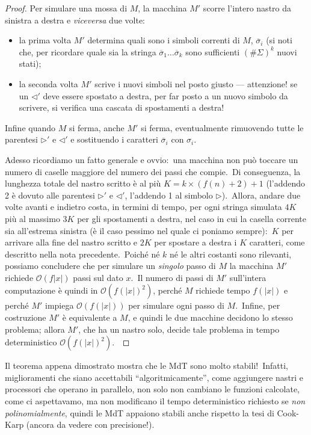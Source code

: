 \begin{proof}
    Per simulare una mossa di $M$, la macchina $M'$ scorre l'intero nastro da sinistra a destra e \textit{viceversa} due volte:
    \begin{itemize}
        \item la prima volta $M'$ determina quali sono i simboli correnti di $M$, $\overline{\sigma}_i$ (si noti che, per ricordare quale sia la stringa $\overline{\sigma}_1 \dots \overline{\sigma}_k$ sono sufficienti $(\#\Sigma)^k$ nuovi stati);
        \item la seconda volta $M'$ scrive i nuovi simboli nel posto giusto --- attenzione! se un $\triangleleft'$ deve essere spostato a destra, per far posto a un nuovo simbolo da scrivere, si verifica una cascata di spostamenti a destra!
    \end{itemize}
    Infine quando $M$ si ferma, anche $M'$ si ferma, eventualmente rimuovendo tutte le parentesi $\triangleright'$ e $\triangleleft'$ e sostituendo i caratteri $\overline{\sigma}_i$ con $\sigma_i$.\

    Adesso ricordiamo un fatto generale e ovvio:\ una macchina non può toccare un numero di caselle maggiore del numero dei passi che compie.\
    Di conseguenza, la lunghezza totale del nastro scritto è al più $K = k \times (f(n) + 2) +1$ (l'addendo 2 è dovuto alle parentesi $\triangleright'$ e $\triangleleft'$, l'addendo 1 al simbolo $\triangleright$).\
    Allora, andare due volte avanti e indietro costa, in termini di tempo, per ogni stringa simulata $4K$ più al massimo $3K$ per gli spostamenti a destra, nel caso in cui la casella corrente sia all'estrema sinistra (è il caso pessimo nel quale ci poniamo sempre):\ $K$ per arrivare alla fine del nastro scritto e $2K$ per spostare a destra i $K$ caratteri, come descritto nella nota precedente.\
    Poiché né $k$ né le altri costanti sono rilevanti, possiamo concludere che per simulare un \textit{singolo} passo di $M$ la macchina $M'$ richiede $\mathcal{O}(f|x|)$ passi sul dato $x$.\
    Il numero di passi di $M'$ sull'intera computazione è quindi in $\mathcal{O}(f(|x|)^2)$, perché $M$ richiede tempo $f(|x|)$ e perché $M'$ impiega $\mathcal{O}(f(|x|))$ per simulare ogni passo di $M$.\
    Infine, per costruzione $M'$ è equivalente a $M$, e quindi le due macchine decidono lo stesso problema; allora $M'$, che ha un nastro solo, decide tale problema in tempo deterministico $\mathcal{O}(f(|x|)^2)$.\
\end{proof}

\noindent Il teorema appena dimostrato mostra che le MdT sono molto stabili!\
Infatti, miglioramenti che siano accettabili ``algoritmicamente'', come aggiungere nastri e processori che operano in parallelo, non solo non cambiano le funzioni calcolate, come ci aspettavamo, ma non modificano il tempo deterministico richiesto se \textit{non polinomialmente}, quindi le MdT appaiono stabili anche rispetto la tesi di Cook-Karp (ancora da vedere con precisione!).\

